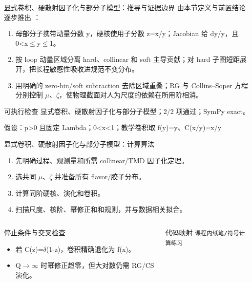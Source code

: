 \begin{frame}[t]{显式卷积、硬散射因子化与部分子模型：推导与证据边界}
\footnotesize
{}\quad 由本节定义与前置结论逐步推出 ：
\begin{enumerate}
\item 母部分子携带动量分数 y，硬核使用子分数 z=x/\allowbreak{}y；Jacobian 给 dy/\allowbreak{}y，且 0<x\ensuremath{\le}y\ensuremath{\le}1。
\item 按 loop 动量区域分离 hard、collinear 和 soft 主导贡献；对 hard 子图短距展开，把长程敏感性吸收进规范不变分布。
\item 用明确的 zero-bin/\allowbreak{}soft subtraction 去除区域重叠；RG 与 Collins--Soper 方程分别控制 \ensuremath{\mu}、\ensuremath{\zeta}，使物理截面对人为尺度的依赖在所用阶相消。
\end{enumerate}\begin{block}{可执行检查}
\quad 显式卷积、硬散射因子化与部分子模型；2/2 项通过；SymPy exact。
\par\scriptsize 假设：p>0 且固定 Lambda；0<x<1；教学卷积取 f(y)=y、C(x/\allowbreak{}y)=x/\allowbreak{}y
\end{block}
\end{frame}

\begin{frame}[t]{显式卷积、硬散射因子化与部分子模型：计算算法}
\footnotesize
{}\begin{enumerate}
\item 先明确过程、观测量和所需 collinear/\allowbreak{}TMD 因子化定理。
\item 选共同 \ensuremath{\mu}、\ensuremath{\zeta} 并准备所有 flavor/\allowbreak{}胶子分布。
\item 计算同阶硬核、演化和卷积。
\item 扫描尺度、核阶、幂修正和和规则，并与数据相关拟合。
\end{enumerate}\begin{columns}[T,onlytextwidth]
\begin{block}{停止条件与交叉检查}\scriptsize\begin{itemize}
\item[\CheckMark] 若 C(z)=\ensuremath{\delta}(1-z)，卷积精确退化为 f(x)。
\item[\CheckMark] Q\ensuremath{\rightarrow}\ensuremath{\infty} 时幂修正趋零，但大对数仍需 RG/\allowbreak{}CS 演化。
\end{itemize}\end{block}
\begin{block}{代码映射}
\scriptsize \texttt{课程内纸笔/\allowbreak{}符号计算练习}
\end{block}\end{columns}\end{frame}

